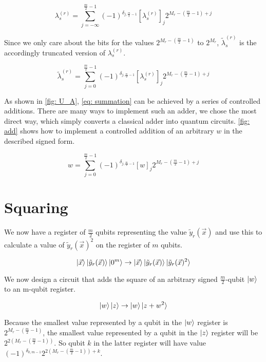 \begin{equation}
    \lambda^{(r)}_s = \sum_{j = -\infty}^{\frac{m}{2} - 1} (-1)^{\delta_{j, \frac{m}{2} - 1}}[\lambda^{(r)}_s]_j2^{M_r - (\frac{m}{2} - 1) + j}
\end{equation}

Since we only care about the bits for the values $2^{M_r - (\frac{m}{2} - 1)}$ to $2^{M_r}$, $\tilde{\lambda}^{(r)}_s$ is the accordingly truncated version of $\lambda^{(r)}_s$.

\begin{equation}
    \tilde{\lambda}^{(r)}_s = \sum_{j = 0}^{\frac{m}{2} - 1} (-1)^{\delta_{j, \frac{m}{2} - 1}}[\lambda^{(r)}_s]_j2^{M_r - (\frac{m}{2} - 1) + j}
\end{equation}

As shown in \ref{fig: U_A}, \eqref{eq: summation} can be achieved by a series of controlled additions. There are many ways to implement such an adder, we chose the most direct way, which simply converts a classical adder into quantum circuits. \ref{fig: add} shows how to implement a controlled addition of an arbitrary $w$ in the described signed form.

\begin{equation}
    w = \sum_{j = 0}^{\frac{m}{2} - 1} (-1)^{\delta_{j, \frac{m}{2} - 1}}[w]_j2^{M_r - (\frac{m}{2} - 1) + j}
\end{equation}

\section{Squaring}

We now have a register of $\frac{m}{2}$ qubits representing the value $\tilde{y}_r(\vec{x})$ and use this to calculate a value of $\tilde{y}_r(\vec{x})^2$ on the register of $m$ qubits.

\begin{equation}
    \ket{\vec{x}}\ket{\tilde{y}_r(\vec{x})}\ket{0^m} \rightarrow \ket{\vec{x}}\ket{\tilde{y}_r(\vec{x})}\ket{\tilde{y}_r(\vec{x})^2} \label{eq: y^2}
\end{equation}

We now design a circuit that adds the square of an arbitrary signed $\frac{m}{2}$-qubit $\ket{w}$ to an m-qubit register.

\begin{equation}
    \ket{w}\ket{z} \rightarrow \ket{w}\ket{z + w^2}
\end{equation}

Because the smallest value represented by a qubit in the $\ket{w}$ register is $2^{M_r - (\frac{m}{2} - 1)}$, the smallest value represented by a qubit in the $\ket{z}$ register will be $2^{2(M_r - (\frac{m}{2} - 1))}$. So qubit $k$ in the latter register will have value $(-1)^{\delta_{k, m - 1}}2^{2(M_r - (\frac{m}{2} - 1)) + k}$.

